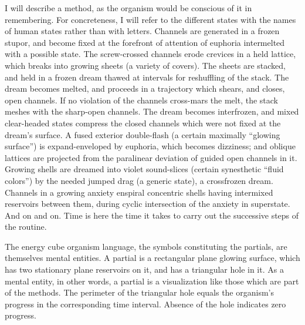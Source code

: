 I will describe a method, as the organism would be conscious of it in 
remembering. For concreteness, I will refer to the different states with the 
names of human states rather than with letters. Channels are generated in a 
frozen stupor, and become fixed at the forefront of attention of euphoria 
intermelted with a possible state. The screw-crossed channels erode crevices 
in a held lattice, which breaks into growing sheets (a variety of covers). The 
sheets are stacked, and held in a frozen dream thawed at intervals for 
reshuffling of the stack. The dream becomes melted, and proceeds in a 
trajectory which shears, and closes, open channels. If no violation of the 
channels cross-mars the melt, the stack meshes with the sharp-open channels. 
The dream becomes interfrozen, and mixed clear-headed states compress the 
closed channels which were not fixed at the dream's surface. A fused 
exterior double-flash (a certain maximally \enquote{glowing surface}) is 
expand-enveloped by euphoria, which becomes dizziness; and oblique 
lattices are projected from the paralinear deviation of guided open channels 
in it. Growing shells are dreamed into violet sound-slices (certain synesthetic 
\enquote{fluid colors}) by the needed jumped drag (a generic state), a crossfrozen 
dream. Channels in a growing anxiety enspiral concentric shells having 
intermixed reservoirs between them, during cyclic intersection of the anxiety 
in superstate. And on and on. Time is here the time it takes to carry out the 
successive steps of the routine. 

The energy cube organism language, the symbols constituting the 
partials, are themselves mental entities. A partial is a rectangular plane 
glowing surface, which has two stationary plane reservoirs on it, and has a 
triangular hole in it. As a mental entity, in other words, a partial is a 
visualization like those which are part of the methods. The perimeter of the 
triangular hole equals the organism's progress in the corresponding time 
interval. Absence of the hole indicates zero progress. 


